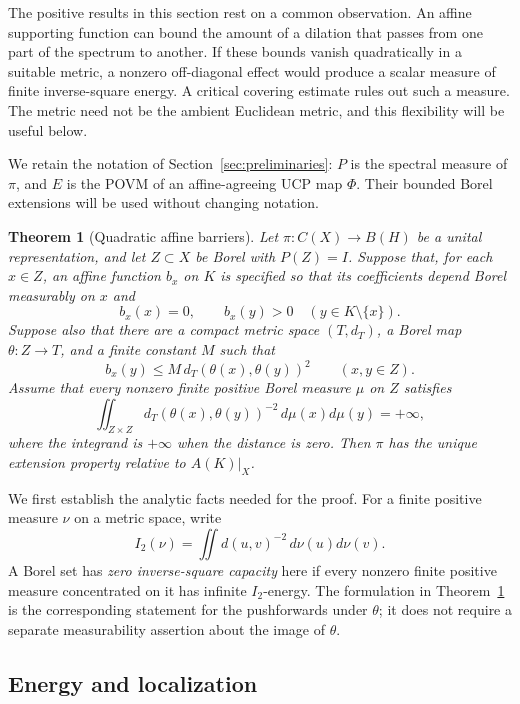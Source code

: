 \documentclass[11pt,letterpaper]{amsart}
\newtheorem{theorem}{Theorem}[section]
\theoremstyle{definition}
\theoremstyle{remark}
\numberwithin{equation}{section}
\begin{document}
The positive results in this section rest on a common observation.
An affine supporting function can bound the amount of a dilation
that passes from one part of the spectrum to another. If these
bounds vanish quadratically in a suitable metric, a nonzero
off-diagonal effect would produce a scalar measure of finite
inverse-square energy. A critical covering estimate rules out
such a measure. The metric need not be the ambient Euclidean
metric, and this flexibility will be useful below.

We retain the notation of Section~\ref{sec:preliminaries}:
$P$ is the spectral measure of $\pi$, and $E$ is the POVM of
an affine-agreeing UCP map $\Phi$. Their bounded Borel extensions
will be used without changing notation.

\begin{theorem}[Quadratic affine barriers]\label{bar:thm}
Let $\pi:C(X)\to B(H)$ be a unital representation, and let
$Z\subset X$ be Borel with $P(Z)=I$. Suppose that, for each
$x\in Z$, an affine function $b_x$ on $K$ is specified so that
its coefficients depend Borel measurably on $x$ and
\[
 b_x(x)=0,\qquad b_x(y)>0\quad(y\in K\setminus\{x\}).
\]
Suppose also that there are a compact metric space $(T,d_T)$,
a Borel map $\theta:Z\to T$, and a finite constant $M$ such that
\[
 b_x(y)\le M\,d_T(\theta(x),\theta(y))^2
 \qquad(x,y\in Z).
\]
Assume that every nonzero finite positive Borel measure $\mu$
on $Z$ satisfies
\[
 \iint_{Z\times Z}
 d_T(\theta(x),\theta(y))^{-2}\,d\mu(x)d\mu(y)=+\infty,
\]
where the integrand is $+\infty$ when the distance is zero.
Then $\pi$ has the unique extension property relative to
$A(K)|_X$.
\end{theorem}

We first establish the analytic facts needed for the proof.
For a finite positive measure $\nu$ on a metric space, write
\[
 I_2(\nu)=\iint d(u,v)^{-2}\,d\nu(u)d\nu(v).
\]
A Borel set has \emph{zero inverse-square capacity} here if
every nonzero finite positive measure concentrated on it has
infinite $I_2$-energy. The formulation in
Theorem~\ref{bar:thm} is the corresponding statement for the
pushforwards under $\theta$; it does not require a separate
measurability assertion about the image of $\theta$.

\subsection{Energy and localization}
\end{document}
